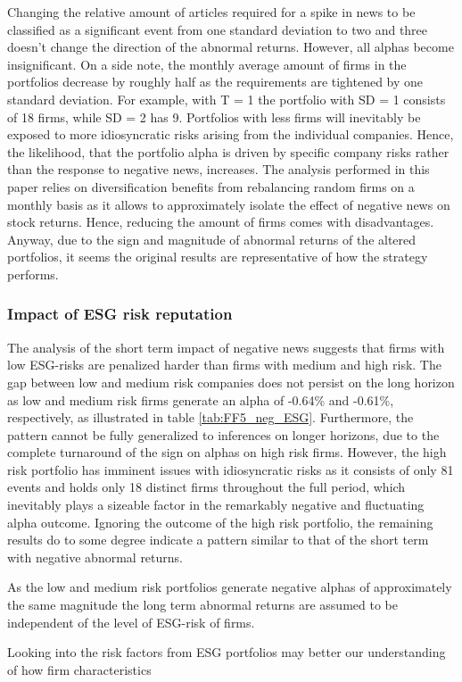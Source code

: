 Changing the relative amount of articles required for a spike in news to be classified as a significant event from one standard deviation to two and three doesn't change the direction of the abnormal returns. However, all alphas become insignificant. On a side note, the monthly average amount of firms in the portfolios decrease by roughly half as the requirements are tightened by one standard deviation. For example, with T = 1 the portfolio with SD = 1 consists of 18 firms, while SD = 2 has 9. Portfolios with less firms will inevitably be exposed to more idiosyncratic risks arising from the individual companies. Hence, the likelihood, that the portfolio alpha is driven by specific company risks rather than the response to negative news, increases. The analysis performed in this paper relies on diversification benefits from rebalancing random firms on a monthly basis as it allows to approximately isolate the effect of negative news on stock returns. Hence, reducing the amount of firms comes with disadvantages.  Anyway, due to the sign and magnitude of abnormal returns of the altered portfolios, it seems the original results are representative of how the strategy performs. 

\subsubsection{Impact of ESG risk reputation}

The analysis of the short term impact of negative news suggests that firms with low ESG-risks are penalized harder than firms with medium and high risk. The gap between low and medium risk companies does not persist on the long horizon as low and medium risk firms generate an alpha of -0.64\% and -0.61\%, respectively, as illustrated in table \ref{tab:FF5_neg_ESG}. 
Furthermore, the pattern cannot be fully generalized to inferences on longer horizons, due to the complete turnaround of the sign on alphas on high risk firms. However, the high risk portfolio has imminent issues with idiosyncratic risks as it consists of only 81 events and holds only 18 distinct firms throughout the full period, which inevitably plays a sizeable factor in the remarkably negative and fluctuating alpha outcome. Ignoring the outcome of the high risk portfolio, the remaining results do to some degree indicate a pattern similar to that of the short term with negative abnormal returns.

As the low and medium risk portfolios generate negative alphas of approximately the same magnitude the long term abnormal returns are assumed to be independent of the level of ESG-risk of firms.  


Looking into the risk factors from ESG portfolios may better our understanding of how firm characteristics 

